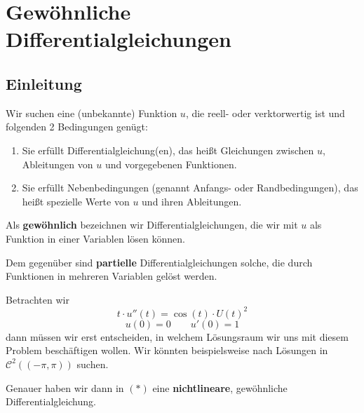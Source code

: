 \documentclass[main.tex]{subfiles}
\begin{document}
 
\chapter{Gewöhnliche Differentialgleichungen}


\section{Einleitung}

\begin{Definition}
  Wir suchen eine (unbekannte) Funktion $u$, die reell- oder verktorwertig ist und folgenden 2 Bedingungen genügt:
  \begin{enumerate}
    \item Sie erfüllt Differentialgleichung(en), das heißt Gleichungen zwischen $u$, Ableitungen von $u$ und vorgegebenen Funktionen.
    \item Sie erfüllt Nebenbedingungen (genannt Anfangs- oder Randbedingungen), das heißt spezielle Werte von $u$ und ihren Ableitungen.
  \end{enumerate}

  Als \textbf{gewöhnlich} bezeichnen wir Differentialgleichungen, die wir mit $u$ als Funktion in einer Variablen lösen können.

  Dem gegenüber sind \textbf{partielle} Differentialgleichungen solche, die durch Funktionen in mehreren Variablen gelöst werden.
\end{Definition}

\begin{Beispiel}[Allgemein]
  Betrachten wir
  \begin{equation*}
  t \cdot u''(t) = \cos(t) \cdot U(t)^2 \tag{*} \tag{*} 
  \end{equation*}
  $$u(0) = 0 \qquad u'(0) = 1$$
  dann müssen wir erst entscheiden, in welchem Lösungsraum wir uns mit diesem Problem beschäftigen wollen. Wir könnten beispielsweise nach Lösungen in $\mathcal{C}^2 ((-\pi,\pi))$ suchen.


 Genauer haben wir dann in $(*)$ eine \textbf{nichtlineare}, gewöhnliche Differentialgleichung.
\end{Beispiel}
\end{document}
